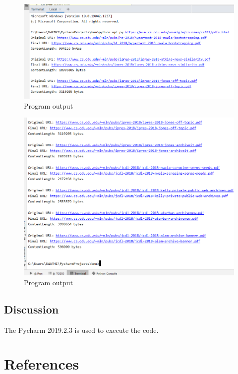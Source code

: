 \documentclass[12pt]{article}
\begin{document}
\begin{figure}[h]
    \centering
    \includegraphics[trim=0 0 10 8, clip, width=\textwidth] {si.PNG}
    \caption{Program output}
    \label{fig:web-growth}
\end{figure}

\begin{figure}[h]
    \centering
    \includegraphics[trim=0 0 10 8, clip, width=\textwidth] {si1.PNG}
    \caption{Program output}
    \label{fig:web-growth}
\end{figure}
\subsection*{Discussion}
The Pycharm 2019.2.3 is used to execute the code.
\section*{References}
\end{document}
